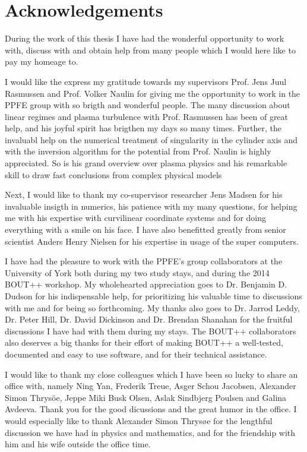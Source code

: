 \chapter*{Acknowledgements}
%
During the work of this thesis I have had the wonderful opportunity to work with, discuss with and obtain help from many people which I would here like to pay my homeage to.

I would like the express my gratitude towards my supervisors Prof. Jens Juul Rasmussen and Prof. Volker Naulin for giving me the opportunity to work in the PPFE group with so brigth and wonderful people.
The many discussion about linear regimes and plasma turbulence with Prof. Rasmussen has been of great help, and his joyful spirit has brigthen my days so many times.
Further, the invaluabl help on the numerical treatment of singularity in the cylinder axis and with the inversion algorithm for the potential from Prof. Naulin is highly appreciated.
So is his grand overview over plasma physics and his remarkable skill to draw fast conclusions from complex physical models

Next, I would like to thank my co-supervisor researcher Jens Madsen for his invaluable insigth in numerics, his patience with my many questions, for helping me with his expertise with curvilinear coordinate systems and for doing everything with a smile on his face.
I have also benefitted greatly from senior scientist Anders Henry Nielsen for his expertise in usage of the super computers.

I have had the pleasure to work with the PPFE's group collaborators at the University of York both during my two study stays, and during the 2014 BOUT++ workshop.
My wholehearted appreciation goes to Dr. Benjamin D. Dudson for his indispensable help, for prioritizing his valuable time to discussions with me and for being so forthcoming.
My thanks also goes to Dr. Jarrod Leddy, Dr. Peter Hill, Dr. David Dickinson and Dr. Brendan Shanahan for the fruitful discussions I have had with them during my stays.
The BOUT++ collaborators also deserves a big thanks for their effort of making BOUT++ a well-tested, documented and easy to use software, and for their technical assistance.

I would like to thank my close colleagues which I have been so lucky to share an office with, namely Ning Yan, Frederik Treue, Asger Schou Jacobsen, Alexander Simon Thrys{\"o}e, Jeppe Miki Busk Olsen, Aslak Sindbjerg Poulsen and Galina Avdeeva. Thank you for the good dicussions and the great humor in the office.
I would especially like to thank Alexander Simon Thrys{\o}e for the lengthful discussion we have had in physics and mathematics, and for the friendship with him and his wife outside the office time.

